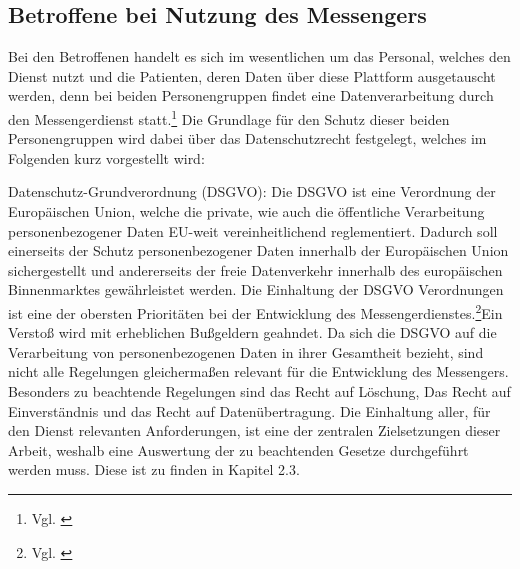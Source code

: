 \subsection{Betroffene bei Nutzung des Messengers}\label{subsection:bbndd}
Bei den Betroffenen handelt es sich im wesentlichen um das Personal, welches den Dienst nutzt und die Patienten, deren Daten über diese Plattform ausgetauscht werden, denn bei beiden Personengruppen findet eine Datenverarbeitung durch den Messengerdienst statt.\footnote{Vgl. \cite[S. 13]{Bundesverband-Gesundheits-IT-e.V.2016}} Die Grundlage für den Schutz dieser beiden Personengruppen wird dabei über das Datenschutzrecht festgelegt, welches im Folgenden kurz vorgestellt wird:

Datenschutz-Grundverordnung (DSGVO): Die DSGVO ist eine Verordnung der Europäischen Union, welche die private, wie auch die öffentliche Verarbeitung personenbezogener Daten EU-weit vereinheitlichend reglementiert. Dadurch soll einerseits der Schutz personenbezogener Daten innerhalb der Europäischen Union sichergestellt und andererseits der freie Datenverkehr innerhalb des europäischen Binnenmarktes gewährleistet werden. Die Einhaltung der DSGVO Verordnungen ist eine der obersten Prioritäten bei der Entwicklung des Messengerdienstes.\footnote{Vgl. \cite[S. 2 ff.]{Voigt2018}}Ein Verstoß wird mit erheblichen Bußgeldern geahndet. Da sich die DSGVO auf die Verarbeitung von personenbezogenen Daten in ihrer Gesamtheit bezieht, sind nicht alle Regelungen gleichermaßen relevant für die Entwicklung des Messengers. Besonders zu beachtende Regelungen sind \glqq das Recht auf Löschung\grqq{}, \glqq Das Recht auf Einverständnis\grqq{} und \glqq das Recht auf Datenübertragung\grqq. Die Einhaltung aller, für den Dienst relevanten Anforderungen, ist eine der zentralen Zielsetzungen dieser Arbeit, weshalb eine Auswertung der zu beachtenden Gesetze durchgeführt werden muss. Diese ist zu finden in Kapitel 2.3.

